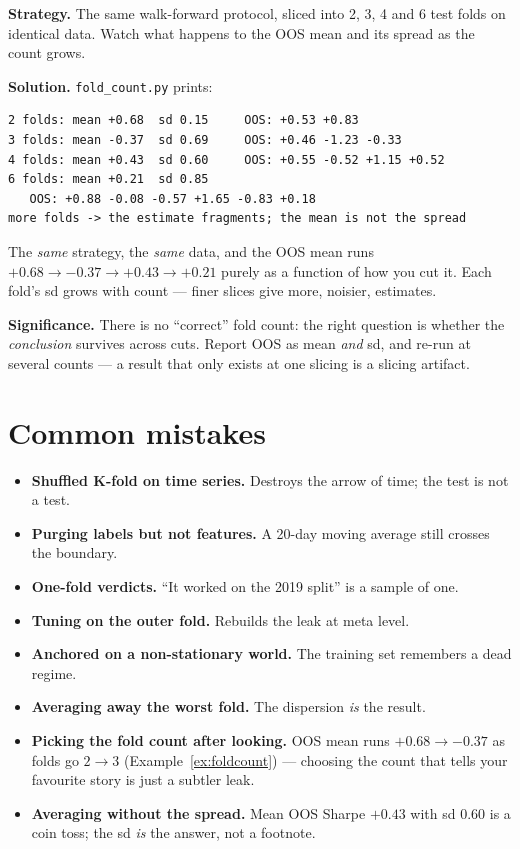 \begin{example}\label{ex:foldcount}
\textbf{Strategy.} The same walk-forward protocol, sliced into
2, 3, 4 and 6 test folds on identical data. Watch what happens to
the OOS mean and its spread as the count grows.

\textbf{Solution.} \texttt{fold\_count.py} prints:
\begin{verbatim}
2 folds: mean +0.68  sd 0.15     OOS: +0.53 +0.83
3 folds: mean -0.37  sd 0.69     OOS: +0.46 -1.23 -0.33
4 folds: mean +0.43  sd 0.60     OOS: +0.55 -0.52 +1.15 +0.52
6 folds: mean +0.21  sd 0.85
   OOS: +0.88 -0.08 -0.57 +1.65 -0.83 +0.18
more folds -> the estimate fragments; the mean is not the spread
\end{verbatim}
The \emph{same} strategy, the \emph{same} data, and the OOS mean
runs $+0.68 \to -0.37 \to +0.43 \to +0.21$ purely as a function
of how you cut it. Each fold's sd grows with count --- finer
slices give more, noisier, estimates.

\textbf{Significance.} There is no ``correct'' fold count: the
right question is whether the \emph{conclusion} survives across
cuts. Report OOS as mean \emph{and} sd, and re-run at several
counts --- a result that only exists at one slicing is a slicing
artifact.
\end{example}

\section{Common mistakes}
\begin{itemize}
\item \textbf{Shuffled K-fold on time series.} Destroys the arrow of time; the test is
  not a test.
\item \textbf{Purging labels but not features.} A 20-day moving average still crosses
  the boundary.
\item \textbf{One-fold verdicts.} ``It worked on the 2019 split'' is a sample of one.
\item \textbf{Tuning on the outer fold.} Rebuilds the leak at meta level.
\item \textbf{Anchored on a non-stationary world.} The training set remembers a dead regime.
\item \textbf{Averaging away the worst fold.} The dispersion \emph{is} the result.
\item \textbf{Picking the fold count after looking.} OOS
mean runs $+0.68 \to -0.37$ as folds go $2\to3$
(Example~\ref{ex:foldcount}) --- choosing the count that tells
your favourite story is just a subtler leak.
\item \textbf{Averaging without the spread.} Mean OOS Sharpe
$+0.43$ with sd $0.60$ is a coin toss; the sd \emph{is} the
answer, not a footnote.\end{itemize}

